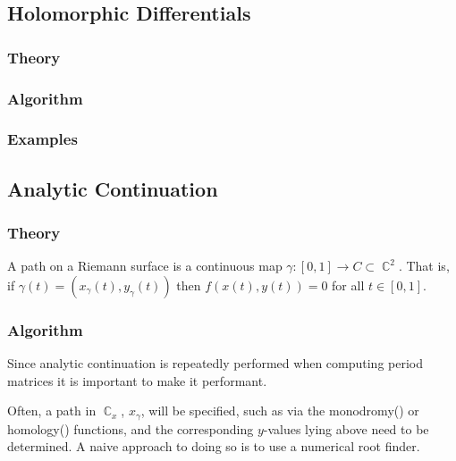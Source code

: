 \documentclass{article}
\DeclareMathOperator{\CC}{\mathbb{C}}
\begin{document}
\subsection{Holomorphic Differentials}

%
\subsubsection{Theory}
%



%
\subsubsection{Algorithm}
%
%
\subsubsection{Examples}
%

\subsection{Analytic Continuation}

%
\subsubsection{Theory}
%

A path on a Riemann surface is a continuous map $\gamma : [0,1] \to C
\subset \CC^2$. That is, if $\gamma(t) = (x_\gamma(t), y_\gamma(t))$
then $f(x(t),y(t)) = 0$ for all $t \in [0,1]$.


%
\subsubsection{Algorithm}
%

Since analytic continuation is repeatedly performed when computing
period matrices it is important to make it performant.

Often, a path in $\CC_x$, $x_\gamma$, will be specified, such as via the
{\sc monodromy() or homology()} functions, and the corresponding
$y$-values lying above need to be determined. A naive approach to doing
so is to use a numerical root finder.
\end{document}
